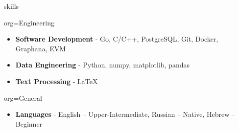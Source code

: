 \documentclass{resume}
\begin{document}
\makeheader

\begin{ResumeSection}{skills}
    \newcommand{\skill}[2]{\textbf{#1} - #2}
    \begin{ResumeSubsection}{org=Engineering}
        \begin{itemize}
            \item \skill{Software Development}{Go, C/C++, PostgreSQL, Git, Docker, Graphana, EVM}
            \item \skill{Data Engineering}{Python, numpy, matplotlib, pandas}
            \item \skill{Text Processing}{LaTeX}
        \end{itemize}
    \end{ResumeSubsection}

    \begin{ResumeSubsection}{org=General}
        \begin{itemize}
            \item \skill{Languages}{English -- Upper-Intermediate, Russian -- Native, Hebrew -- Beginner}
        \end{itemize}
    \end{ResumeSubsection}
\end{ResumeSection}
\end{document}
